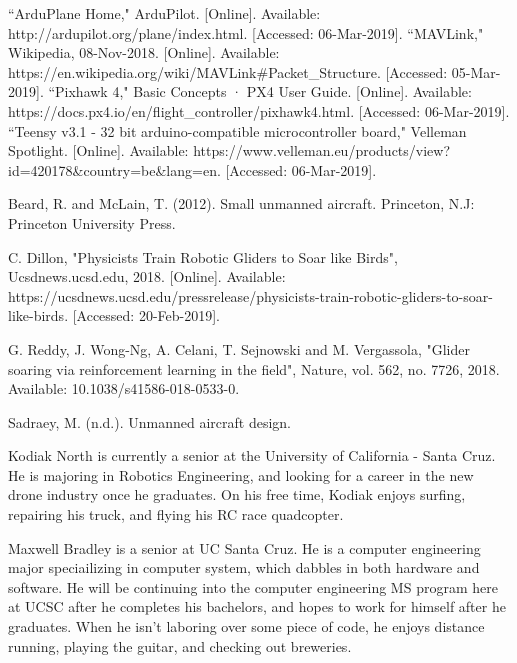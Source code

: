 \documentclass[12pt,journal,compsoc]{IEEEtran}
\begin{document}
\begin{thebibliography}{1}
``ArduPlane Home," ArduPilot. [Online]. Available: http://ardupilot.org/plane/index.html. [Accessed: 06-Mar-2019].
``MAVLink," Wikipedia, 08-Nov-2018. [Online]. Available: https://en.wikipedia.org/wiki/MAVLink\#Packet\_Structure. [Accessed: 05-Mar-2019].
``Pixhawk 4," Basic Concepts · PX4 User Guide. [Online]. Available: https://docs.px4.io/en/flight\_controller/pixhawk4.html. [Accessed: 06-Mar-2019].
``Teensy v3.1 - 32 bit arduino-compatible microcontroller board," Velleman Spotlight. [Online]. Available: https://www.velleman.eu/products/view?id=420178\&country=be\&lang=en. [Accessed: 06-Mar-2019].

Beard, R. and McLain, T. (2012). Small unmanned aircraft. Princeton, N.J: Princeton University Press.

C. Dillon, "Physicists Train Robotic Gliders to Soar like Birds", Ucsdnews.ucsd.edu, 2018. [Online]. Available: https://ucsdnews.ucsd.edu/pressrelease/physicists-train-robotic-gliders-to-soar-like-birds. [Accessed: 20-Feb-2019].

G. Reddy, J. Wong-Ng, A. Celani, T. Sejnowski and M. Vergassola, "Glider soaring via reinforcement learning in the field", Nature, vol. 562, no. 7726, 2018. Available: 10.1038/s41586-018-0533-0.

Sadraey, M. (n.d.). Unmanned aircraft design.


\end{thebibliography}


\begin{IEEEbiographynophoto}{Kodiak North}
is currently a senior at the University of California - Santa Cruz. He is majoring in Robotics Engineering, and looking for a career in the new drone industry once he graduates. On his free time, Kodiak enjoys surfing, repairing his truck, and flying his RC race quadcopter.
\end{IEEEbiographynophoto}

\begin{IEEEbiographynophoto}{Maxwell Bradley}
is a senior at UC Santa Cruz. He is a computer engineering major speciailizing in computer system, which dabbles in both hardware and software. He will be continuing into the computer engineering MS program here at UCSC after he completes his bachelors, and hopes to work for himself after he graduates. When he isn't laboring over some piece of code, he enjoys distance running, playing the guitar, and checking out breweries.
\end{IEEEbiographynophoto}
\end{document}
